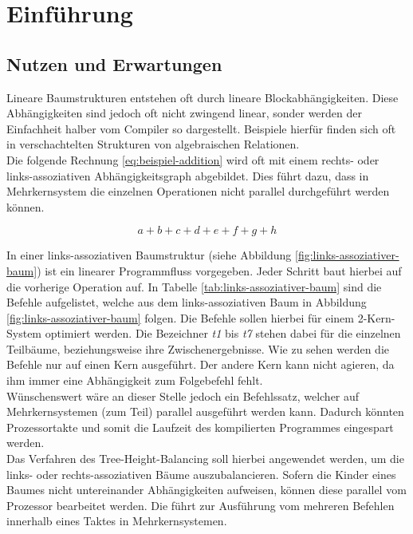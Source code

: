 \chapter{Einführung}
\label{Einfuehrung}




\section{Nutzen und Erwartungen}
\label{Nutzen}

Lineare Baumstrukturen entstehen oft durch lineare Blockabhängigkeiten. Diese Abhängigkeiten sind jedoch oft nicht zwingend linear, sonder werden der Einfachheit halber vom Compiler so dargestellt. Beispiele hierfür finden sich oft in verschachtelten Strukturen von algebraischen Relationen. \\
Die folgende Rechnung \ref{eq:beispiel-addition} wird oft mit einem rechts- oder links-assoziativen Abhängigkeitsgraph abgebildet. Dies führt dazu, dass in Mehrkernsystem die einzelnen Operationen nicht parallel durchgeführt werden können.

\begin{equation} \label{eq:beispiel-addition}
a + b + c + d + e + f + g + h
\end{equation}

In einer links-assoziativen Baumstruktur (siehe Abbildung \ref{fig:links-assoziativer-baum}) ist ein linearer Programmfluss vorgegeben. Jeder Schritt baut hierbei auf die vorherige Operation auf. In Tabelle \ref{tab:links-assoziativer-baum} sind die Befehle aufgelistet, welche aus dem links-assoziativen Baum in Abbildung \ref{fig:links-assoziativer-baum} folgen. Die Befehle sollen hierbei für einem 2-Kern-System optimiert werden. Die Bezeichner \textit{t1} bis \textit{t7} stehen dabei für die einzelnen Teilbäume, beziehungsweise ihre Zwischenergebnisse. Wie zu sehen werden die Befehle nur auf einen Kern ausgeführt. Der andere Kern kann nicht agieren, da ihm immer eine Abhängigkeit zum Folgebefehl fehlt.\\

Wünschenswert wäre an dieser Stelle jedoch ein Befehlssatz, welcher auf Mehrkernsystemen (zum Teil) parallel ausgeführt werden kann. Dadurch könnten Prozessortakte und somit die Laufzeit des kompilierten Programmes eingespart werden.\\
Das Verfahren des Tree-Height-Balancing soll hierbei angewendet werden, um die links- oder rechts-assoziativen Bäume auszubalancieren. Sofern die Kinder eines Baumes nicht untereinander Abhängigkeiten aufweisen, können diese parallel vom Prozessor bearbeitet werden. Die führt zur Ausführung vom mehreren Befehlen innerhalb eines Taktes in Mehrkernsystemen.



